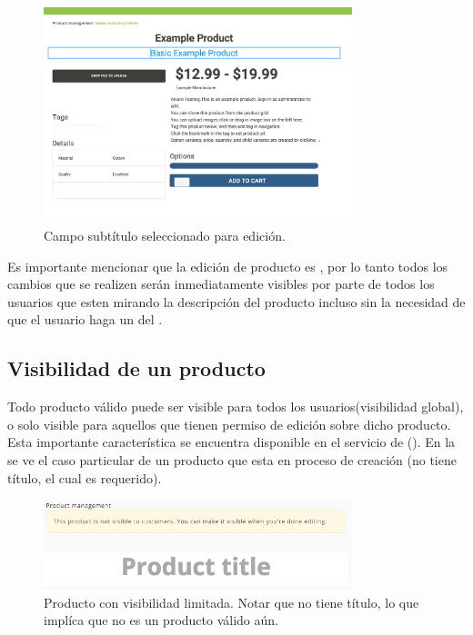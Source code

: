 		\begin{figure}[H]
			\centering
			\includegraphics[width=0.8\textwidth]{figuras/productos/interfaz_edicion_editando_subtitulo.png}

			\caption{Campo subtítulo seleccionado para edición.}
			\label{figure:features:interfaz_edicion_editando_subtitulo}
		\end{figure}

		Es importante mencionar que la edición de producto es \reactive, por lo tanto todos los cambios que se realizen serán inmediatamente visibles por parte de todos los usuarios que esten mirando la descripción del producto incluso sin la necesidad de que el usuario haga un  del \websiteINT.


	\subsection{Visibilidad de un producto}
	
		Todo producto válido puede ser visible para todos los usuarios(visibilidad global), o solo visible para aquellos que tienen permiso de edición sobre dicho producto. Esta importante característica se encuentra disponible en el servicio de \shopifyNAME(). En la  se ve el caso particular de un producto que esta en proceso de creación (no tiene título, el cual es requerido).

		\begin{figure}[H]
			\centering
			\includegraphics[width=0.8\textwidth]{figuras/solution/product/visibility/new.png}

			\caption{Producto con visibilidad limitada. Notar que no tiene título, lo que implíca que no es un producto válido aún.}
			\label{figure:solution:product:visibility:new}
		\end{figure}

